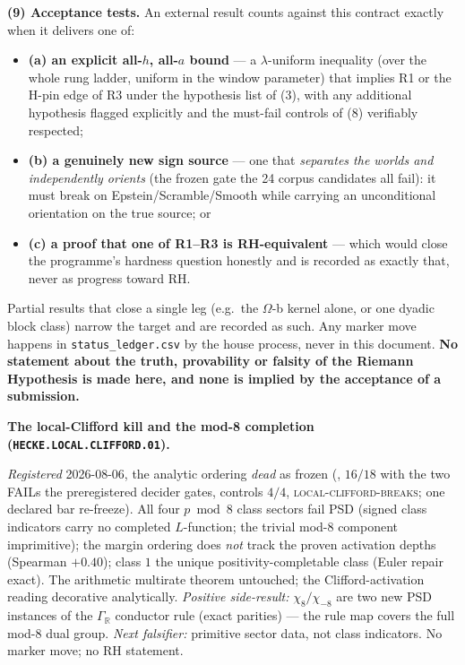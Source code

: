 \par\smallskip\noindent\textbf{(9) Acceptance tests.}  An external result counts against this
contract exactly when it delivers one of:
\begin{itemize}
\item \textbf{(a) an explicit all-$h$, all-$a$ bound} --- a $\lambda$-uniform inequality (over
  the whole rung ladder, uniform in the window parameter) that implies R1 or the H-pin edge of
  R3 under the hypothesis list of (3), with any additional hypothesis flagged explicitly and
  the must-fail controls of (8) verifiably respected;
\item \textbf{(b) a genuinely new sign source} --- one that \emph{separates the worlds and
  independently orients} (the frozen gate the 24 corpus candidates all fail): it must break on
  Epstein/Scramble/Smooth while carrying an unconditional orientation on the true source; or
\item \textbf{(c) a proof that one of R1--R3 is RH-equivalent} --- which would close the
  programme's hardness question honestly and is recorded as exactly that, never as progress
  toward RH.
\end{itemize}
Partial results that close a single leg (e.g.\ the $\Omega$-b kernel alone, or one dyadic
block class) narrow the target and are recorded as such.  Any marker move happens in
\texttt{status\_ledger.csv} by the house process, never in this document.  \textbf{No
statement about the truth, provability or falsity of the Riemann Hypothesis is made here, and
none is implied by the acceptance of a submission.}


\par\smallskip\noindent\textbf{The local-Clifford kill and the
mod-8 completion (\texttt{HECKE.LOCAL.CLIFFORD.01}).}
{\sloppy
\emph{Registered} 2026-08-06, the analytic ordering \emph{dead}
as frozen (, $16/18$ with
the two FAILs the preregistered decider gates, controls $4/4$,
\textsc{local-clifford-breaks}; one declared bar re-freeze).
All four $p\bmod8$ class sectors fail PSD (signed class
indicators carry no completed $L$-function; the trivial mod-8
component imprimitive); the margin ordering does \emph{not} track
the proven activation depths (Spearman $+0.40$); class $1$ the
unique positivity-completable class (Euler repair exact).  The
arithmetic multirate theorem untouched; the Clifford-activation
reading decorative analytically.  \emph{Positive side-result:}
$\chi_8/\chi_{-8}$ are two new PSD instances of the
$\Gamma_{\mathbb R}$ conductor rule (exact parities) --- the rule
map covers the full mod-8 dual group.  \emph{Next falsifier:}
primitive sector data, not class indicators.  No marker move; no
RH statement.\par}



